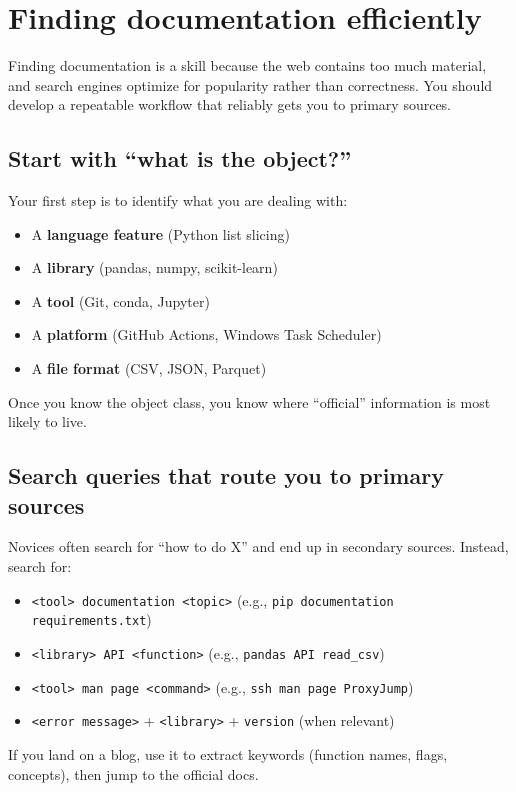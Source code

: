 \section{Finding documentation efficiently}
Finding documentation is a skill because the web contains too much material, and search engines optimize for popularity rather than correctness. You should develop a repeatable workflow that reliably gets you to primary sources.

\subsection{Start with “what is the object?”}
Your first step is to identify what you are dealing with:
\begin{itemize}[noitemsep]
  \item A \textbf{language feature} (Python list slicing)
  \item A \textbf{library} (pandas, numpy, scikit-learn)
  \item A \textbf{tool} (Git, conda, Jupyter)
  \item A \textbf{platform} (GitHub Actions, Windows Task Scheduler)
  \item A \textbf{file format} (CSV, JSON, Parquet)
\end{itemize}

Once you know the object class, you know where “official” information is most likely to live.

\subsection{Search queries that route you to primary sources}
Novices often search for “how to do X” and end up in secondary sources. Instead, search for:
\begin{itemize}[noitemsep]
  \item \texttt{<tool> documentation <topic>} (e.g., \texttt{pip documentation requirements.txt})
  \item \texttt{<library> API <function>} (e.g., \texttt{pandas API read\_csv})
  \item \texttt{<tool> man page <command>} (e.g., \texttt{ssh man page ProxyJump})
  \item \texttt{<error message>} + \texttt{<library>} + \texttt{version} (when relevant)
\end{itemize}

If you land on a blog, use it to extract keywords (function names, flags, concepts), then jump to the official docs.

